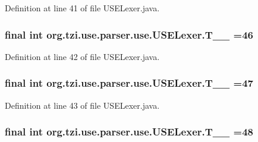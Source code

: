 Definition at line 41 of file U\-S\-E\-Lexer.\-java.

\hypertarget{classorg_1_1tzi_1_1use_1_1parser_1_1use_1_1_u_s_e_lexer_ac25166f4ebe2c5222d9529c0663d8dd4}{
\subsubsection[{T\-\_\-\-\_\-46}]{\setlength{\rightskip}{0pt plus 5cm}final int org.\-tzi.\-use.\-parser.\-use.\-U\-S\-E\-Lexer.\-T\-\_\-\-\_ =46\hspace{0.3cm}{\ttfamily [static]}}}\label{classorg_1_1tzi_1_1use_1_1parser_1_1use_1_1_u_s_e_lexer_ac25166f4ebe2c5222d9529c0663d8dd4}


Definition at line 42 of file U\-S\-E\-Lexer.\-java.

\hypertarget{classorg_1_1tzi_1_1use_1_1parser_1_1use_1_1_u_s_e_lexer_a4929f9e06e02a1f339b8f4a428a333f1}{
\subsubsection[{T\-\_\-\-\_\-47}]{\setlength{\rightskip}{0pt plus 5cm}final int org.\-tzi.\-use.\-parser.\-use.\-U\-S\-E\-Lexer.\-T\-\_\-\-\_ =47\hspace{0.3cm}{\ttfamily [static]}}}\label{classorg_1_1tzi_1_1use_1_1parser_1_1use_1_1_u_s_e_lexer_a4929f9e06e02a1f339b8f4a428a333f1}


Definition at line 43 of file U\-S\-E\-Lexer.\-java.

\hypertarget{classorg_1_1tzi_1_1use_1_1parser_1_1use_1_1_u_s_e_lexer_abab668d6eef9457d6aeb445c35d4a989}{
\subsubsection[{T\-\_\-\-\_\-48}]{\setlength{\rightskip}{0pt plus 5cm}final int org.\-tzi.\-use.\-parser.\-use.\-U\-S\-E\-Lexer.\-T\-\_\-\-\_ =48\hspace{0.3cm}{\ttfamily [static]}}}\label{classorg_1_1tzi_1_1use_1_1parser_1_1use_1_1_u_s_e_lexer_abab668d6eef9457d6aeb445c35d4a989}


